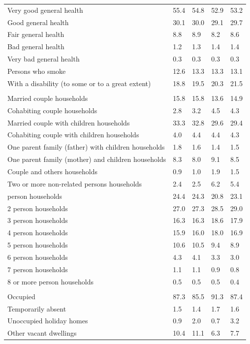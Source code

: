 \documentclass{article}
\begin{document}
\begin{table}[h]
\begin{tabular}{KTTTT}
    \hline
Very good general health & 55.4& 54.8&52.9& 53.2\\
Good general health & 30.1& 30.0& 29.1& 29.7\\
Fair general health & 8.8& 8.9&8.2& 8.6\\
Bad general health & 1.2& 1.3&1.4& 1.4\\
Very bad general health & 0.3& 0.3&0.3& 0.3\\
    \hline
Persons who smoke & 12.6& 13.3&13.3& 13.1\\
    \hline
With a disability (to some or to a great extent) & 18.8& 19.5&20.3& 21.5\\
\hline
    \\ 
    \hline
Married couple households & 15.8& 15.8& 13.6& 14.9\\
Cohabiting couple households & 2.8& 3.2& 4.5& 4.3\\
Married couple with children households & 33.3& 32.8& 29.6& 29.4\\
Cohabiting couple with children households & 4.0& 4.4& 4.4& 4.3\\
One parent family (father) with  children households & 1.8& 1.6& 1.4& 1.5\\
One parent family (mother) and children households & 8.3& 8.0& 9.1& 8.5\\
Couple and others households  & 0.9& 1.0& 1.9& 1.5\\
Two or more non-related persons households & 2.4& 2.5& 6.2& 5.4\\
     person households & 24.4& 24.3& 20.8& 23.1\\
2 person households & 27.0& 27.3& 28.5& 29.0\\
3 person households & 16.3& 16.3& 18.6& 17.9\\
4 person households & 15.9& 16.0& 18.0& 16.9\\
5 person households & 10.6& 10.5&  9.4&  8.9\\
6 person households & 4.3& 4.1& 3.3& 3.0\\
7 person households & 1.1& 1.1& 0.9& 0.8\\
8 or more person households & 0.5& 0.5& 0.5& 0.4\\
\hline
    \\ 
    \hline
Occupied & 87.3& 85.5& 91.3& 87.4\\
Temporarily absent & 1.5& 1.4& 1.7& 1.6\\
Unoccupied holiday homes & 0.9& 2.0& 0.7& 3.2\\
Other vacant dwellings & 10.4& 11.1&  6.3&  7.7\\
\hline
\end{tabular}
\end{table}
\end{document}
